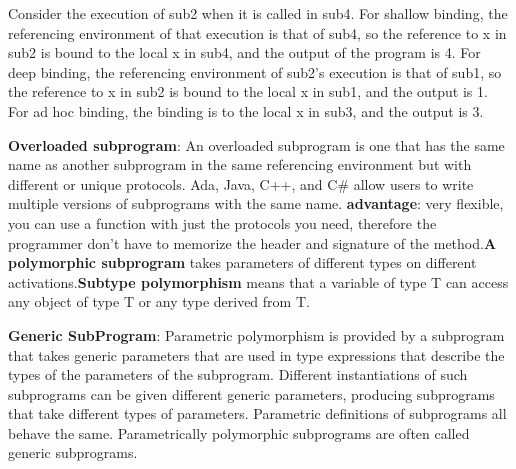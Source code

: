 Consider the execution of sub2 when it is called in sub4. For shallow
binding, the referencing environment of that execution is that of sub4, so the
reference to x in sub2 is bound to the local x in sub4, and the output of the
program is 4. For deep binding, the referencing environment of sub2’s execution
is that of sub1, so the reference to x in sub2 is bound to the local x in
sub1, and the output is 1. For ad hoc binding, the binding is to the local x in
sub3, and the output is 3.


\textbf{Overloaded subprogram}: An overloaded subprogram is one that has the same name as another subprogram in the same referencing environment but with different or unique protocols. Ada, Java, C++, and C# allow users to write multiple versions of subprograms with the same name. \textbf{advantage}: very flexible, you can use a function with just the protocols you need, therefore the programmer don't have to memorize the header and signature of the method.\textbf{A polymorphic subprogram} takes parameters of different types on different activations.\textbf{Subtype polymorphism} means that a variable of type T can access any object of type T or any type derived from T.

\textbf{Generic SubProgram}: Parametric polymorphism is provided by a subprogram that takes
generic parameters that are used in type expressions that describe the types
of the parameters of the subprogram. Different instantiations of such subprograms
can be given different generic parameters, producing subprograms that
take different types of parameters. Parametric definitions of subprograms all
behave the same. Parametrically polymorphic subprograms are often called
generic subprograms.